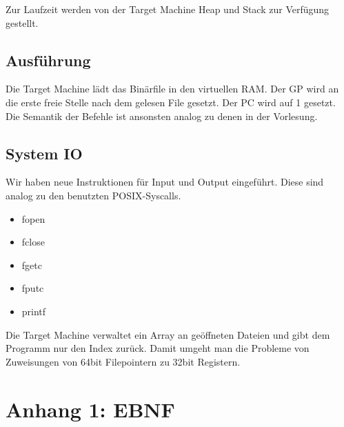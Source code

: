 \documentclass[a4paper,12pt]{article}
\begin{document}
	Zur Laufzeit werden von der Target Machine Heap und Stack zur Verfügung gestellt.

	\subsection{Ausführung}
	Die Target Machine lädt das Binärfile in den virtuellen RAM.
	Der GP wird an die erste freie Stelle nach dem gelesen File gesetzt.
	Der PC wird auf 1 gesetzt.
	Die Semantik der Befehle ist ansonsten analog zu denen in der Vorlesung.

	\subsection{System IO}
	Wir haben neue Instruktionen für Input und Output eingeführt.
	Diese sind analog zu den benutzten POSIX-Syscalls.
	\begin{itemize}
		\item fopen
		\item fclose
		\item fgetc
		\item fputc
		\item printf
	\end{itemize}
	Die Target Machine verwaltet ein Array an geöffneten Dateien und gibt dem Programm nur den Index zurück.
	Damit umgeht man die Probleme von Zuweisungen von 64bit Filepointern zu 32bit Registern.

	\newpage
	\section{Anhang 1: EBNF}
	
\end{document}
